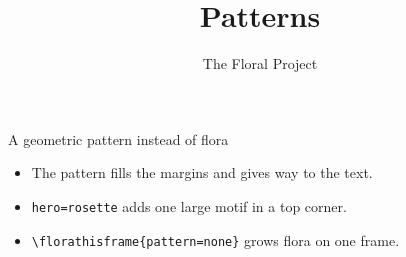 \documentclass[aspectratio=169]{beamer}
\title{Patterns}\author{The Floral Project}\date{}
\begin{document}
\begin{frame}{A geometric pattern instead of flora}
  \begin{itemize}
    \item The pattern fills the margins and gives way to the text.
    \item \texttt{hero=rosette} adds one large motif in a top corner.
    \item \texttt{\textbackslash florathisframe\{pattern=none\}} grows flora on one frame.
  \end{itemize}
\end{frame}
\end{document}
